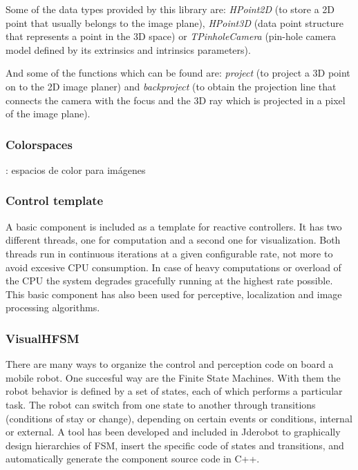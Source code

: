 \documentclass[twocolumn]{svjour3}          %
\begin{document}
Some of the data types provided by this library are: \textit{HPoint2D} (to store a 2D point that usually belongs to the image plane), \textit{HPoint3D} (data point structure that represents a point in the 3D space) or \textit{TPinholeCamera} (pin-hole camera model defined by its extrinsics and intrinsics parameters).

And some of the functions which can be found are: \textit{project} (to project a 3D point on to the 2D image planer) and \textit{backproject} (to obtain the projection line that connects the camera with the focus and the 3D ray which is projected in a pixel of the image plane).

\subsubsection{Colorspaces}: espacios de color para imágenes

\subsubsection{Control template}

A basic component is included as a template for reactive controllers. It has two different threads, one for computation and a second one for visualization. Both threads run in continuous iterations at a given configurable rate, not more to avoid excesive CPU consumption. In case of heavy computations or overload of the CPU the system degrades gracefully running at the highest rate possible. This basic component has also been used for perceptive, localization and image processing algorithms.

\subsubsection{VisualHFSM}

There are many ways to organize the control and perception code on board a mobile robot. One succesful way are the Finite State Machines. With them the robot behavior is defined by a set of states, each of which performs a particular task. The robot can switch from one state to another through transitions (conditions of stay or change), depending on certain events or conditions, internal or external. A tool has been developed and included in Jderobot to graphically design hierarchies of FSM, insert the specific code of states and transitions, and automatically generate the component source code in C++.
\end{document}
